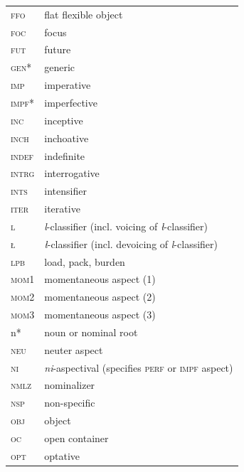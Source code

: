 \begin{tabularx}{.50\textwidth}{lQ}
\textsc{ffo} & flat flexible object\\
\textsc{foc} & focus\\
\textsc{fut} & future\\
\textsc{gen*} & generic\\
\textsc{imp} & imperative\\
\textsc{impf*} & imperfective\\
\textsc{inc} & inceptive\\
\textsc{inch} & inchoative\\
\textsc{indef} & indefinite\\
\textsc{intrg} & interrogative\\
\textsc{ints} & intensifier\\
\textsc{iter} & iterative\\
\textsc{l} & \textit{l}-classifier (incl. voicing of \textit{ł}-classifier)\\
\textsc{ł} & \textit{ł}-classifier (incl. devoicing of \textit{l}-classifier)\\
\textsc{lpb} & load, pack, burden\\
\textsc{mom}1 & momentaneous aspect (1)\\
\textsc{mom}2 & momentaneous aspect (2)\\
\textsc{mom}3 & momentaneous aspect (3)\\
{n*} & noun or nominal root\\
\textsc{neu} & neuter aspect\\
\textsc{ni} & \textit{ni}-aspectival (specifies \textsc{perf} or \textsc{impf} aspect)\\
\textsc{nmlz} & nominalizer\\
\textsc{nsp} & non-specific\\
\textsc{obj} & object\\
\textsc{oc} & open container\\
\textsc{opt} & optative\\
\end{tabularx}

